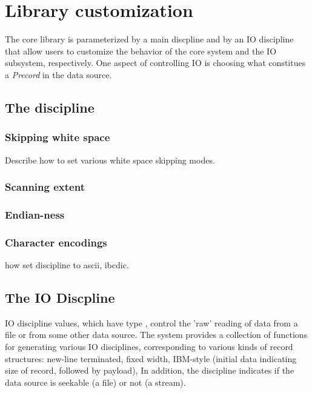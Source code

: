 \chapter{Library customization}
\label{chap:library-customization}
The \pads{} core library is parameterized by a main discpline and by
an IO discipline that allow users to customize the behavior of the
core system and the IO subsystem, respectively.  One aspect of
controlling IO is choosing what constitues a \textit{Precord} in the
data source.

\section{The \pads{} discipline}
\subsection{Skipping white space}
\label{sec:library-customization-white-space}
Describe how to set various white space skipping modes.

\subsection{Scanning extent}
\label{sec:library-customization-scanning-extent}

\subsection{Endian-ness}
\label{sec:library-customization-endian}

\subsection{Character encodings}
\label{sec:library-customization-character-encodings}
how set discipline to ascii, ibcdic.

\section{The IO Discpline}
IO discipline values, which have type , control the
'raw' reading of data from a file or from some other data source.  
The \pads{} system provides a collection of functions for generating
various IO disciplines, corresponding to various kinds of record
structures: new-line terminated, fixed width, IBM-style (initial data
indicating size of record, followed by payload), \etc{}  In addition,
the discipline indicates if the data source is seekable (a file) or
not (a stream).


